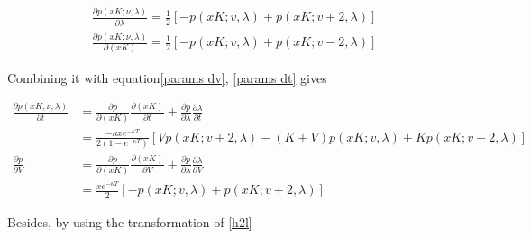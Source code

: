 \begin{equation}\label{pdf1}
    \begin{gathered}
        \frac{\partial p(xK;\nu,\lambda)}{\partial \lambda}=\frac{1}{2}[-p(xK ; v, \lambda)+p(xK ; v+2, \lambda)] \\
        \frac{\partial p(xK;\nu,\lambda)}{\partial (xK)}=\frac{1}{2}[-p(xK ; v, \lambda)+p(xK ; v-2, \lambda)]
    \end{gathered}
\end{equation}




\noindent Combining it with equation\eqref{params dv}, \eqref{params dt} gives

\begin{equation}\label{pdf diff}
    \begin{aligned}
        \frac{\partial p(xK; \nu, \lambda)}{\partial t}&= \frac{\partial p}{\partial (xK)}\frac{\partial (xK)}{\partial t} + \frac{\partial p}{\partial \lambda} \frac{\partial \lambda}{\partial t} \\
        &= \frac{-\kappa x e^{-\kappa T}}{2(1 - e^{-\kappa T})} \left[Vp(xK ; v+2, \lambda) - (K+V) p(xK ; v, \lambda) + K p(xK ; v-2, \lambda)\right]\\
        \frac{\partial p}{\partial V} &= \frac{\partial p}{\partial (xK)}\frac{\partial (xK)}{\partial V} + \frac{\partial p}{\partial \lambda} \frac{\partial \lambda}{\partial V} \\
        &= \frac{x e^{-\kappa T}}{2} [-p(xK ; v, \lambda)+p(xK ; v+2, \lambda)]
    \end{aligned}
\end{equation}

\noindent Besides, by using the transformation of \eqref{h2l}

